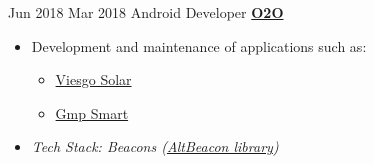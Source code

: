 \documentclass[letterpaper]{twentysecondcv} %
\begin{document}
\begin{twenty}
\twentyitem
    	{Jun 2018}
		{Mar 2018}
        {Android Developer}
        {\href{www.mo2o.com}{\textbf{O2O}}}
        {}
        {\begin{itemize}
        
        	\item Development and maintenance of applications such as:
        		{\begin{itemize}
        		\item\href{https://play.google.com/store/apps/details?id=com.viesgo.solar&hl=es}{Viesgo Solar}
         		\end{itemize}}
         		{\begin{itemize}
        		\item\href{https://play.google.com/store/apps/details?id=com.mo2o.gmp}{Gmp Smart}
         		\end{itemize}}
         	
        	\item \textit{Tech Stack: Beacons (\href{https://github.com/AltBeacon/android-beacon-library}{AltBeacon library})}
        

\end{itemize}}
\end{twenty}
\end{document}
